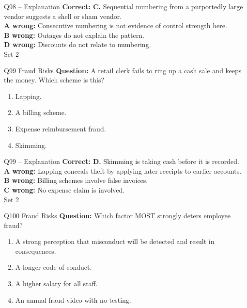 \documentclass[aspectratio=169,10pt]{beamer}
\begin{document}
\begin{frame}[t]{Q98 -- Explanation}
	\footnotesize
	\textbf{Correct: C.} Sequential numbering from a purportedly large vendor suggests a shell or sham vendor. \\[5pt]
\textbf{A wrong:} Consecutive numbering is not evidence of control strength here. \\[3pt]
\textbf{B wrong:} Outages do not explain the pattern. \\[3pt]
\textbf{D wrong:} Discounts do not relate to numbering. \\[3pt]
	\vfill {\tiny Set 2}
\end{frame}

\begin{frame}[t]{Q99 \hfill {\scriptsize Fraud Risks}}
	\small
	\textbf{Question:} A retail clerk fails to ring up a cash sale and keeps the money. Which scheme is this?
	\begin{enumerate}[label=\Alph*.,itemsep=1pt,topsep=3pt]
			\item Lapping.
			\item A billing scheme.
			\item Expense reimbursement fraud.
			\item Skimming.
	\end{enumerate}
\end{frame}

\begin{frame}[t]{Q99 -- Explanation}
	\footnotesize
	\textbf{Correct: D.} Skimming is taking cash before it is recorded. \\[5pt]
\textbf{A wrong:} Lapping conceals theft by applying later receipts to earlier accounts. \\[3pt]
\textbf{B wrong:} Billing schemes involve false invoices. \\[3pt]
\textbf{C wrong:} No expense claim is involved. \\[3pt]
	\vfill {\tiny Set 2}
\end{frame}

\begin{frame}[t]{Q100 \hfill {\scriptsize Fraud Risks}}
	\small
	\textbf{Question:} Which factor MOST strongly deters employee fraud?
	\begin{enumerate}[label=\Alph*.,itemsep=1pt,topsep=3pt]
			\item A strong perception that misconduct will be detected and result in consequences.
			\item A longer code of conduct.
			\item A higher salary for all staff.
			\item An annual fraud video with no testing.
	\end{enumerate}
\end{frame}
\end{document}
